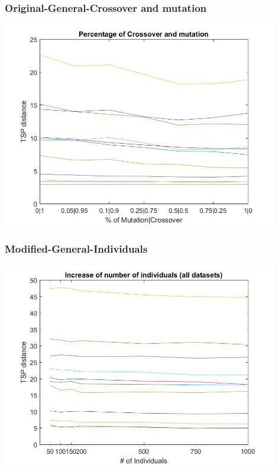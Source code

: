 \subsubsection{Original-General-Crossover and mutation}
\begin{center}
\includegraphics[width=12cm]{img/xalt_edges/crossMut.jpg}
\end{center}
\subsubsection{Modified-General-Individuals}
\begin{center}
\includegraphics[width=12cm]{img/order_crossover/numberIndiv.jpg}
\end{center}
